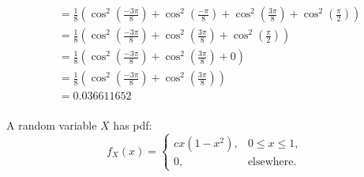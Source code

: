 \documentclass[answers]{exam}
\begin{document}
\begin{questions}
\begin{parts}
\begin{solution}
\begin{align*}
                        & = \frac{1}{8} \left(\cos^2 \left(\frac{-3 \pi}{8}\right) + \cos^2 \left(\frac{-\pi}{8}\right) + \cos^2 \left(\frac{3 \pi}{8}\right) + \cos^2 \left(\frac{\pi}{2}\right)\right)                                                                                                        \\
                        & = \frac{1}{8} \left(\cos^2 \left(\frac{-3 \pi}{8}\right) + \cos^2 \left(\frac{3 \pi}{8}\right) + \cos^2 \left(\frac{\pi}{2}\right)\right)                                                                                                                                           \\
                        & = \frac{1}{8} \left(\cos^2 \left(\frac{-3 \pi}{8}\right) + \cos^2 \left(\frac{3 \pi}{8}\right) + 0\right)                                                                                                                                                                         \\
                        & = \frac{1}{8} \left(\cos^2 \left(\frac{-3 \pi}{8}\right) + \cos^2 \left(\frac{3 \pi}{8}\right)\right)                                                                                                                                                                             \\
                        & = 0.036611652                                                                                                                                                                           \\
                        \end{align*}
        \end{solution}
    \end{parts}

    \question
    A random variable $X$ has pdf:
    \begin{equation*}
        f_X(x) = \begin{cases}
            c x (1 - x^2), & 0 \le x \le 1,    \\
            0,             & \text{elsewhere}.
        \end{cases}
    \end{equation*}
    \begin{parts}

\end{parts}
\end{questions}
\end{document}

